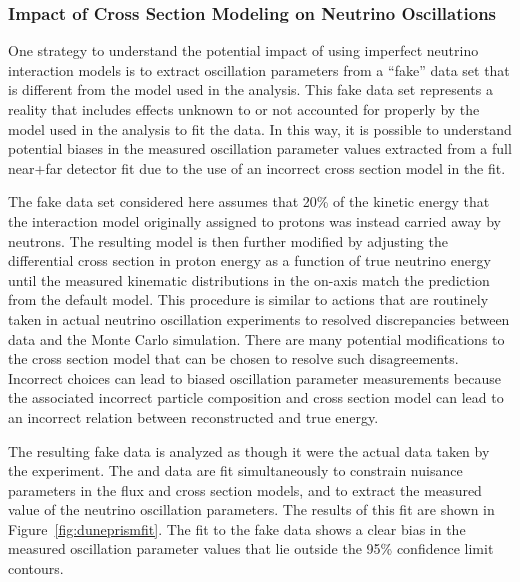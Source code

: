 \subsubsection{Impact of Cross Section Modeling on Neutrino Oscillations}

One strategy to understand the potential impact of using imperfect neutrino interaction models is to extract oscillation parameters from a ``fake'' data set that is different from the model used in the analysis.  This fake data set represents a reality that includes effects unknown to or not accounted for properly by the model used in the analysis to fit the data. In this way, it is possible to understand potential biases in the measured oscillation parameter values extracted from a full near+far detector fit due to the use of an incorrect cross section model in the fit. 


The fake data set considered here assumes that 20\% of the kinetic energy that the interaction model originally assigned to protons was instead carried away by neutrons. The resulting model is then further modified by adjusting the differential cross section in proton energy as a function of true neutrino energy until the measured kinematic distributions in the on-axis   match the prediction from the default model. This procedure is similar to actions that are routinely taken in actual neutrino oscillation experiments to resolved discrepancies between   data and the Monte Carlo simulation. There are many potential modifications to the cross section model that can be chosen to resolve such disagreements. Incorrect choices can lead to biased oscillation parameter measurements because the associated incorrect particle composition and cross section model can lead to an incorrect relation between reconstructed and true energy.



The resulting fake data is analyzed as though it were the actual data taken by the experiment. The  and   data are fit simultaneously  to constrain nuisance parameters in the flux and cross section models, and to extract the measured value of the neutrino oscillation parameters. The results of this fit are shown in Figure~\ref{fig:duneprismfit}. The fit to the fake data shows a clear bias in the measured oscillation parameter values that lie outside the 95\% confidence limit contours.

